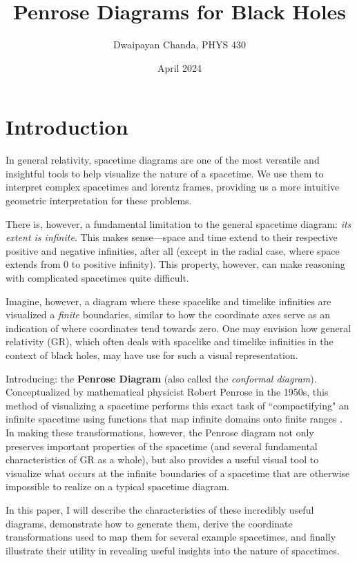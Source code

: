 \documentclass{article}
\title{Penrose Diagrams for Black Holes}
\author{Dwaipayan Chanda, PHYS 430}
\date{April 2024}
\begin{document}
\maketitle

\section{Introduction}
In general relativity, spacetime diagrams are one of the most versatile and insightful tools to help visualize the nature of a spacetime. We use them to interpret complex spacetimes and lorentz frames, providing us a more intuitive geometric interpretation for these problems.

There is, however, a fundamental limitation to the general spacetime diagram: \textit{its extent is infinite}. This makes sense---space and time extend to their respective positive and negative infinities, after all (except in the radial case, where space extends from 0 to positive infinity). This property, however, can make reasoning with complicated spacetimes quite difficult.

Imagine, however, a diagram where these spacelike and timelike infinities are visualized a \textit{finite} boundaries, similar to how the coordinate axes serve as an indication of where coordinates tend towards zero. One may envision how general relativity (GR), which often deals with spacelike and timelike infinities in the context of black holes, may have use for such a visual representation.

Introducing: the \textbf{Penrose Diagram} (also called the \textit{conformal diagram}). Conceptualized by mathematical physicist Robert Penrose in the 1950s, this method of visualizing a spacetime performs this exact task of ``compactifying" an infinite spacetime using functions that map infinite domains onto finite ranges \cite{minkowski_penrose_desc}. In making these transformations, however, the Penrose diagram not only preserves important properties of the spacetime (and several fundamental characteristics of GR as a whole), but also provides a useful visual tool to visualize what occurs at the infinite boundaries of a spacetime that are otherwise impossible to realize on a typical spacetime diagram.

In this paper, I will describe the characteristics of these incredibly useful diagrams, demonstrate how to generate them, derive the coordinate transformations used to map them for several example spacetimes, and finally illustrate their utility in revealing useful insights into the nature of spacetimes.
\end{document}
